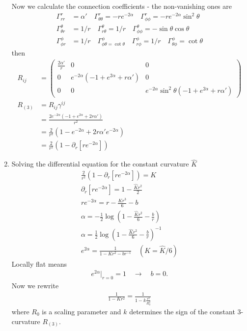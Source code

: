 \documentclass[10pt,a4paper]{book}
\theoremstyle{definition}
\begin{document}
\begin{enumerate}
\begin{itemize}
\end{itemize}
Now we calculate the connection coefficients - the non-vanishing ones are
\begin{align}
\Gamma^r_{rr}&=\alpha'\quad\Gamma^r_{\theta\theta}=-re^{-2\alpha}\quad\Gamma^r_{\phi\phi}=-re^{-2\alpha}\sin^2\theta\\
\Gamma^\theta_{\theta r}&=1/r\quad\Gamma^\theta_{r\theta}=1/r\quad\Gamma^\theta_{\phi\phi}=-\sin\theta\cos\theta\\
\Gamma^\phi_{\phi r}&=1/r\quad\Gamma^\phi_{\phi\theta=\cot\theta}\quad\Gamma^\phi_{r\phi}=1/r\quad\Gamma^\phi_{\theta\phi}=\cot\theta
\end{align}
then
\begin{align}
R_{ij}&=\left(\begin{array}{ccc}
\frac{2\alpha'}{r} & 0 & 0\\
0 & e^{-2\alpha}(-1+e^{2\alpha}+r\alpha') & 0\\
0 & 0 & e^{-2\alpha}\sin^2\theta(-1+e^{2\alpha}+r\alpha')
\end{array}
\right)\\
R_{(3)}&=R_{ij}\gamma^{ij}\\
&=\frac{2e^{-2\alpha}(-1+e^{2\alpha}+2r\alpha')}{r^2}\\
&=\frac{2}{r^2}(1-e^{-2\alpha}+2r\alpha'e^{-2\alpha})\\
&=\frac{2}{r^2}(1-\partial_r[re^{-2\alpha}])
\end{align}
\item Solving the differential equation for the constant curvature $\hat{K}$
\begin{align}
\frac{2}{r^2}(1-\partial_r[re^{-2\alpha}])=K\\
\partial_r[re^{-2\alpha}]=1-\frac{\hat{K}r^2}{2}\\
re^{-2\alpha}=r-\frac{Kr^3}{6}-b\\
\alpha=-\frac{1}{2}\log\left(1-\frac{\hat{K}r^2}{6}-\frac{b}{r}\right)\\
\alpha=\frac{1}{2}\log\left(1-\frac{\hat{K}r^2}{6}-\frac{b}{r}\right)^{-1}\\
e^{2\alpha}=\frac{1}{1-Kr^2-br^{-1}} \quad(K=\hat{K}/6)
\end{align}
Locally flat means
\begin{align}
e^{2\alpha}|_{r=0}=1 \quad\rightarrow\quad b=0.
\end{align}
Now we rewrite
\begin{align}
\frac{1}{1-Kr^2}=\frac{1}{1-k\frac{r^2}{R_0^2}}
\end{align}
where $R_0$ is a scaling parameter and $k$ determines the sign of the constant 3-curvature $R_{(3)}$.

\end{enumerate}
\end{document}
